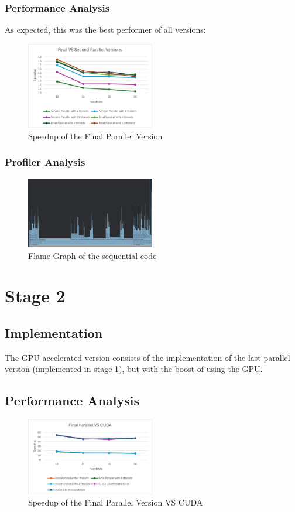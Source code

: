 \documentclass[sigconf]{acmart}
\begin{document}
\subsubsection{Performance Analysis}
As expected, this was the best performer of all versions:
\begin{figure}[h]
    \centering
    \includegraphics[width=0.5\textwidth]{FinalParallelVersion.png}
    \caption{Speedup of the Final Parallel Version}
\end{figure}

\subsubsection{Profiler Analysis}
\begin{figure}[h]
    \centering
    \includegraphics[width=0.5\textwidth]{FinalParallelProfiler.png}
    \caption{Flame Graph of the sequential code}
\end{figure}
\section{Stage 2}
\subsection{Implementation}
The GPU-accelerated version consists of the implementation of the last parallel version (implemented in stage 1), but with the boost of using the GPU.
\subsection{Performance Analysis}
\begin{figure}[h]
    \centering
    \includegraphics[width=0.5\textwidth]{CUDA.png}
    \caption{Speedup of the Final Parallel Version VS CUDA}
\end{figure}
\end{document}

